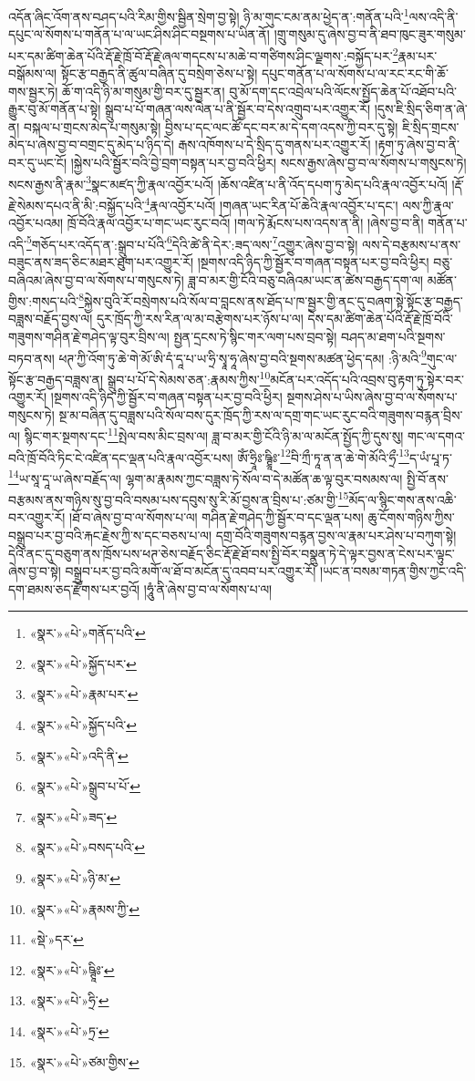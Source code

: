 འདོན་ཞིང་འོག་ནས་བཤད་པའི་རིམ་གྱིས་སྦྱིན་སྲེག་བྱ་སྟེ། ཉི་མ་གུང་ངམ་ནམ་ཕྱེད་ན་:གནོན་པའི་\footnote{«སྣར་»«པེ་»གནོད་པའི་}ལས་འདི་ནི་དཔུང་ལ་སོགས་པ་གནོན་པ་ལ་ཡང་ཤིས་ཤིང་བསྔགས་པ་ཡིན་ནོ། །གྲུ་གསུམ་དུ་ཞེས་བྱ་བ་ནི་ཐབ་ཁུང་ཟུར་གསུམ་པར་དམ་ཚིག་ཆེན་པོའི་རྡོ་རྗེ་ཁྲོ་བོ་རྡོ་རྗེ་ཞལ་གདངས་པ་མཆེ་བ་གཙིགས་ཤིང་ལྗགས་:བསྐྱོད་པར་\footnote{«སྣར་»«པེ་»སྐྱོད་པར་}རྣམ་པར་བསྒོམས་ལ། སྟོང་རྩ་བརྒྱད་ནི་ཚུལ་བཞིན་དུ་བསྲེག་ཅེས་པ་སྟེ། དཔུང་གནོན་པ་ལ་སོགས་པ་ལ་རང་རང་གི་ཆོ་གས་སྦྱར་ཏེ། ཆོ་ག་འདི་ཉི་མ་གསུམ་གྱི་བར་དུ་སྦྱར་ན། བུ་མོ་དག་དང་འབྲེལ་པའི་ལོངས་སྤྱོད་ཆེན་པོ་འཐོབ་པའི་རྒྱུར་བུ་མོ་གནོན་པ་སྟེ། སྒྲུབ་པ་པོ་གཞན་ལས་ལེན་པ་ནི་སྦྱོར་བ་དེས་འགྲུབ་པར་འགྱུར་རོ། །དུས་ཇི་སྲིད་ཅིག་ན་ཞེ་ན། བསྐལ་པ་གྲངས་མེད་པ་གསུམ་སྟེ། བྱིས་པ་དང་ལང་ཚོ་དང་བར་མ་དེ་དག་འདས་ཀྱི་བར་དུ་སྟེ། ཇི་སྲིད་གྲངས་མེད་པ་ཞེས་བྱ་བ་བགྲང་དུ་མེད་པ་ཉིད་དེ། རྒས་འཁོགས་པ་དེ་སྲིད་དུ་གནས་པར་འགྱུར་རོ། །རྟག་ཏུ་ཞེས་བྱ་བ་ནི་བར་དུ་ཡང་ངོ། །སྐྱེས་པའི་སྦྱོར་བའི་བྱེ་བྲག་བསྟན་པར་བྱ་བའི་ཕྱིར། སངས་རྒྱས་ཞེས་བྱ་བ་ལ་སོགས་པ་གསུངས་ཏེ། སངས་རྒྱས་ནི་རྣམ་\footnote{«སྣར་»«པེ་»རྣམ་པར་}སྣང་མཛད་ཀྱི་རྣལ་འབྱོར་པའོ། །ཆོས་འཛིན་པ་ནི་འོད་དཔག་ཏུ་མེད་པའི་རྣལ་འབྱོར་པའོ། །རྡོ་རྗེ་སེམས་དཔའ་ནི་མི་:བསྐྱོད་པའི་\footnote{«སྣར་»«པེ་»སྐྱོད་པའི་}རྣལ་འབྱོར་པའོ། །གཞན་ཡང་རིན་པོ་ཆེའི་རྣལ་འབྱོར་པ་དང་། ལས་ཀྱི་རྣལ་འབྱོར་པའམ། ཁྲོ་བོའི་རྣལ་འབྱོར་པ་གང་ཡང་རུང་བའོ། །གལ་ཏེ་རྨོངས་པས་འདས་ན་ནི། །ཞེས་བྱ་བ་ནི། གནོན་པ་འདི་\footnote{«སྣར་»«པེ་»འདི་ནི་}གཅོད་པར་འདོད་ན་:སྒྲུབ་པ་པོའི་\footnote{«སྣར་»«པེ་»སྒྲུབ་པ་པོ་}དེའི་ཚེ་ནི་དེར་:ཟད་ལས་\footnote{«སྣར་»«པེ་»ཟད་}འགྱུར་ཞེས་བྱ་བ་སྟེ། ལས་དེ་བརྩམས་པ་ནས་བཟུང་ནས་ཟད་ཅིང་མཐར་ཐུག་པར་འགྱུར་རོ། །སྔགས་འདི་ཉིད་ཀྱི་སྦྱོར་བ་གཞན་བསྟན་པར་བྱ་བའི་ཕྱིར། བཅུ་བཞིའམ་ཞེས་བྱ་བ་ལ་སོགས་པ་གསུངས་ཏེ། ཟླ་བ་མར་གྱི་ངོའི་བཅུ་བཞིའམ་ཡང་ན་ཚེས་བརྒྱད་དག་ལ། མཚོན་གྱིས་:གསད་པའི་\footnote{«སྣར་»«པེ་»བསད་པའི་}སྐྱེས་བུའི་རོ་བསྲེགས་པའི་སོལ་བ་བླངས་ནས་ཐོད་པ་ཁ་སྦྱར་གྱི་ནང་དུ་བཞག་སྟེ་སྟོང་རྩ་བརྒྱད་བཟླས་བརྗོད་བྱས་ལ། དུར་ཁྲོད་ཀྱི་རས་རིན་ལ་མ་བརྩེགས་པར་ཉོས་པ་ལ། དེས་དམ་ཚིག་ཆེན་པོའི་རྡོ་རྗེ་ཁྲོ་བོའི་གཟུགས་གཤིན་རྗེ་གཤེད་ལྟ་བུར་བྲིས་ལ། སྤྱན་དྲངས་ཏེ་སྙིང་གར་ལག་པས་བྲབ་སྟེ། བཤད་མ་ཐག་པའི་སྔགས་བཏབ་ནས། ཕཊ་ཀྱི་འོག་ཏུ་ཆེ་གེ་མོ་ཨི་དཾ་དཱ་པ་ཡ་ཧྲི་སྭཱ་ཧཱ་ཞེས་བྱ་བའི་སྔགས་མཚན་ཕྱེད་དམ། :ཉི་མའི་\footnote{«སྣར་»«པེ་»ཉི་མ་}གུང་ལ་སྟོང་རྩ་བརྒྱད་བཟླས་ན། སྒྲུབ་པ་པོ་དེ་སེམས་ཅན་:རྣམས་ཀྱིས་\footnote{«སྣར་»«པེ་»རྣམས་ཀྱི་}མངོན་པར་འདོད་པའི་འབྲས་བུ་རྟག་ཏུ་སྟེར་བར་འགྱུར་རོ། །སྔགས་འདི་ཉིད་ཀྱི་སྦྱོར་བ་གཞན་བསྟན་པར་བྱ་བའི་ཕྱིར། སྔགས་ཤེས་པ་ཡིས་ཞེས་བྱ་བ་ལ་སོགས་པ་གསུངས་ཏེ། སྔ་མ་བཞིན་དུ་བཟླས་པའི་སོལ་བས་དུར་ཁྲོད་ཀྱི་རས་ལ་དགྲ་གང་ཡང་རུང་བའི་གཟུགས་བརྙན་བྲིས་ལ། སྙིང་གར་སྔགས་དང་\footnote{«སྡེ་»དར་}སྤེལ་བས་མིང་བྲས་ལ། ཟླ་བ་མར་གྱི་ངོའི་ཉི་མ་ལ་མངོན་སྤྱོད་ཀྱི་དུས་སུ། གང་ལ་དགའ་བའི་ཁྲོ་བོའི་ཏིང་ངེ་འཛིན་དང་ལྡན་པའི་རྣལ་འབྱོར་པས། ཨོཾ་ཧྲཱིཿ་ཥྚྲཱིཿ་\footnote{«སྣར་»«པེ་»ཥྚཱིཿ་}བི་ཀྲྀ་ཏཱ་ན་ན་ཆེ་གེ་མོའི་ཧྲྀ་\footnote{«སྣར་»«པེ་»ཧྲི་}ད་ཡཾ་པཱ་ཏ་\footnote{«སྣར་»«པེ་»ཏྲ་}ཡ་སཱ་དཱ་ཡ་ཞེས་བརྗོད་ལ། ལྷག་མ་རྣམས་ཀྱང་བཟླས་ཏེ་སོལ་བ་དེ་མཚོན་ཆ་ལྟ་བུར་བསམས་ལ། སྤྱི་བོ་ནས་བརྩམས་ནས་གཉིས་སུ་བྱ་བའི་བསམ་པས་དབུས་སུ་རི་མོ་བྱས་ན་བྲིས་པ་:ཙམ་གྱི་\footnote{«སྣར་»«པེ་»ཙམ་གྱིས་}མོད་ལ་སྙིང་གས་ནས་འཆི་བར་འགྱུར་རོ། །ཐོ་བ་ཞེས་བྱ་བ་ལ་སོགས་པ་ལ། གཤིན་རྗེ་གཤེད་ཀྱི་སྦྱོར་བ་དང་ལྡན་པས། ཆུ་ངོགས་གཉིས་ཀྱིས་བསྒྲུབ་པར་བྱ་བའི་རྐང་རྗེས་ཀྱི་ས་དང་བཅས་པ་ལ། དགྲ་བོའི་གཟུགས་བརྙན་བྱས་ལ་རྣམ་པར་ཤེས་པ་བཀུག་སྟེ། དེའི་ནང་དུ་བཅུག་ནས་ཁྲོས་པས་ཕཊ་ཅེས་བརྗོད་ཅིང་རྡོ་རྗེ་ཐོ་བས་སྤྱི་བོར་བསྣུན་ཏེ་དེ་ལྟར་བྱས་ན་ངེས་པར་ལྟུང་ཞེས་བྱ་བ་སྟེ། བསྒྲུབ་པར་བྱ་བའི་མགོ་ལ་ཐོ་བ་མངོན་དུ་འབབ་པར་འགྱུར་རོ། །ཡང་ན་བསམ་གཏན་གྱིས་ཀྱང་འདི་དག་ཐམས་ཅད་རྫོགས་པར་བྱའོ། །ཧཱུཾ་ནི་ཞེས་བྱ་བ་ལ་སོགས་པ་ལ། 